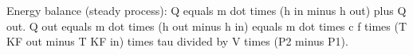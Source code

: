 Energy balance (steady process):  
Q equals m dot times (h in minus h out) plus Q out.  
Q out equals m dot times (h out minus h in) equals m dot times c f times (T KF out minus T KF in) times tau divided by V times (P2 minus P1).